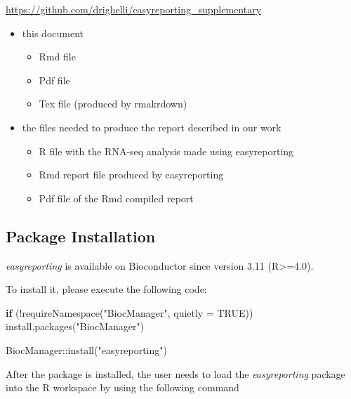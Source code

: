 \documentclass[
]{article}
\newenvironment{Shaded}{\begin{snugshade}}{\end{snugshade}}
\newcommand{\AttributeTok}[1]{\textcolor[rgb]{0.77,0.63,0.00}{#1}}
\newcommand{\ConstantTok}[1]{\textcolor[rgb]{0.00,0.00,0.00}{#1}}
\newcommand{\ControlFlowTok}[1]{\textcolor[rgb]{0.13,0.29,0.53}{\textbf{#1}}}
\newcommand{\FunctionTok}[1]{\textcolor[rgb]{0.00,0.00,0.00}{#1}}
\newcommand{\NormalTok}[1]{#1}
\newcommand{\SpecialCharTok}[1]{\textcolor[rgb]{0.00,0.00,0.00}{#1}}
\newcommand{\StringTok}[1]{\textcolor[rgb]{0.31,0.60,0.02}{#1}}
\providecommand{\tightlist}{%
  \setlength{\itemsep}{0pt}\setlength{\parskip}{0pt}}
\begin{document}
\url{https://github.com/drighelli/easyreporting_supplementary}

\begin{itemize}
\tightlist
\item
  this document

  \begin{itemize}
  \tightlist
  \item
    Rmd file
  \item
    Pdf file
  \item
    Tex file (produced by rmakrdown)
  \end{itemize}
\item
  the files needed to produce the report described in our work

  \begin{itemize}
  \tightlist
  \item
    R file with the RNA-seq analysis made using easyreporting
  \item
    Rmd report file produced by easyreporting
  \item
    Pdf file of the Rmd compiled report
  \end{itemize}
\end{itemize}

\hypertarget{package-installation}{%
\subsection{Package Installation}\label{package-installation}}

\emph{easyreporting} is available on Bioconductor since version 3.11
(R\textgreater=4.0).

To install it, please execute the following code:

\begin{Shaded}
\begin{Highlighting}[]
\ControlFlowTok{if}\NormalTok{ (}\SpecialCharTok{!}\FunctionTok{requireNamespace}\NormalTok{(}\StringTok{"BiocManager"}\NormalTok{, }\AttributeTok{quietly =} \ConstantTok{TRUE}\NormalTok{))}
    \FunctionTok{install.packages}\NormalTok{(}\StringTok{"BiocManager"}\NormalTok{)}

\NormalTok{BiocManager}\SpecialCharTok{::}\FunctionTok{install}\NormalTok{(}\StringTok{"easyreporting"}\NormalTok{)}
\end{Highlighting}
\end{Shaded}

After the package is installed, the user needs to load the
\emph{easyreporting} package into the R workspace by using the following
command
\end{document}
